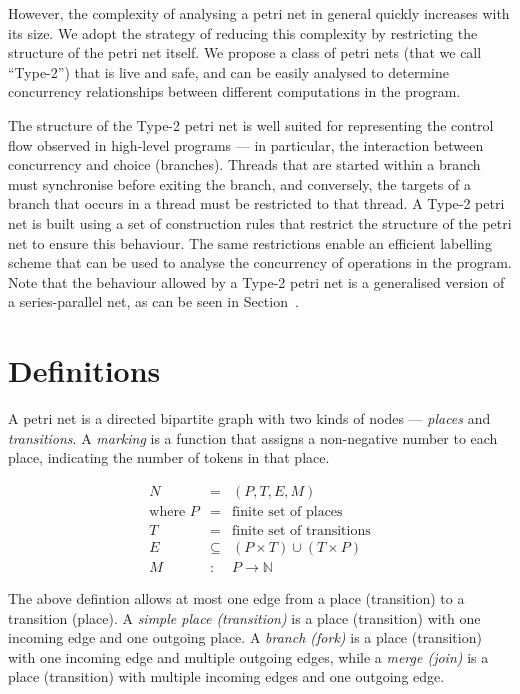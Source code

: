 \documentclass[12pt,a4paper]{article}
\begin{document}
However, the complexity of analysing a petri net in general quickly
increases with its size. We adopt the strategy of reducing this
complexity by restricting the structure of the petri net itself. We
propose a class of petri nets (that we call ``Type-2'') that is live
and safe, and can be easily analysed to determine concurrency
relationships between different computations in the program.

The structure of the Type-2 petri net is well suited for representing
the control flow observed in high-level programs --- in particular,
the interaction between concurrency and choice (branches). Threads
that are started within a branch must synchronise before exiting the
branch, and conversely, the targets of a branch that occurs in a
thread must be restricted to that thread. A Type-2 petri net is built
using a set of construction rules that restrict the structure of the
petri net to ensure this behaviour. The same restrictions enable an
efficient labelling scheme that can be used to analyse the concurrency
of operations in the program. Note that the behaviour allowed by a
Type-2 petri net is a generalised version of a series-parallel
net\cite{something}, as can be seen in Section~\cite{sec:somewhere}.

\section{Definitions}
\label{sec:defintions}

A petri net is a directed bipartite graph with two kinds of nodes ---
\textit{places} and \textit{transitions}. A \textit{marking} is a
function that assigns a non-negative number to each place, indicating
the number of tokens in that place.

\begin{eqnarray*}
  N & = & (P, T, E, M)\\
  \textrm{where } P & = & \textrm{finite set of places}\\
  T & = & \textrm{finite set of transitions}\\
  E & \subseteq & (P \times T) \cup (T \times P)\\
  M & : & P \rightarrow \mathbb{N}
\end{eqnarray*}

The above defintion allows at most one edge from a place (transition)
to a transition (place). A \textit{simple place (transition)} is a
place (transition) with one incoming edge and one outgoing place. A
\textit{branch (fork)} is a place (transition) with one incoming edge
and multiple outgoing edges, while a \textit{merge (join)} is a place
(transition) with multiple incoming edges and one outgoing edge.
\end{document}

